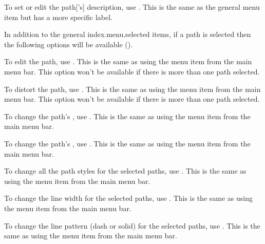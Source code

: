 
To set or edit the \gls{path}['s] description, use
. This is the same as
the general  menu item but has a more specific label.

In addition to the general \gls{index.menu.selected} items,
if a path is selected then the following options will be available
().


To edit the path, use . This is the same as using
the  menu item from the main menu bar.
This option won't be available if there is more than one
path selected.


To distort the path, use . This is the same as using
the  menu item from the main menu bar.
This option won't be available if there is more than one
path selected.


To change the path's , use
. This is the same as using the
 menu item from the main menu bar.


To change the path's , use
. This is the same as using the
 menu item from the main menu bar.


To change all the path styles for the selected paths,
use . This is the same as using the
 menu item from the main menu bar.


To change the line width for the selected paths,
use . This is the same as using the
 menu item from the main menu bar.


To change the line pattern (dash or solid) for the selected paths,
use . This is the same as using the
 menu item from the main menu bar.

